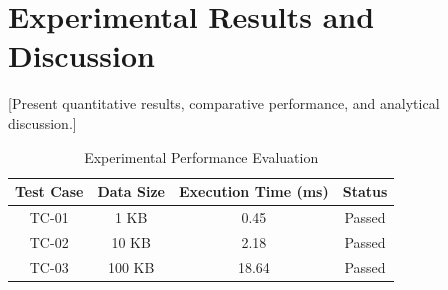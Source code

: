 \section{Experimental Results and Discussion}
\label{sec:results}

[Present quantitative results, comparative performance, and analytical discussion.]

\begin{table}[H]
    \centering
    \caption{Experimental Performance Evaluation}
    \label{tab:sample_results}
    \begin{tabular}{|c|c|c|c|}
        \hline
        \textbf{Test Case} & \textbf{Data Size} & \textbf{Execution Time (ms)} & \textbf{Status} \\ \hline
        TC-01 & 1 KB & 0.45 & Passed \\ \hline
        TC-02 & 10 KB & 2.18 & Passed \\ \hline
        TC-03 & 100 KB & 18.64 & Passed \\ \hline
    \end{tabular}
\end{table}
